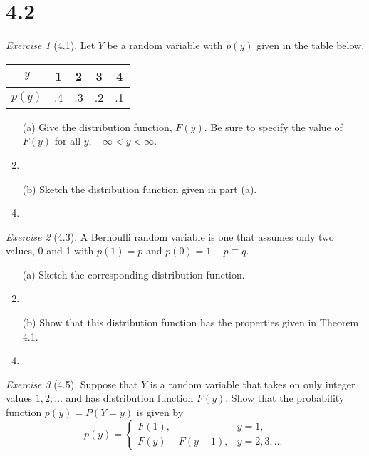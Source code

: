 \documentclass[12pt]{amsart}
\makeatletter
\theoremstyle{remark}
\newtheorem*{exercise}{Exercise}%
\renewenvironment{proof}[1][\proofname]{\par\doublespacing
  \pushQED{\qed}%
  \normalfont \topsep6\p@\@plus6\p@\relax
  \list{}{%
    \settowidth{\leftmargin}{\itshape\proofname:\hskip\labelsep}%
    \setlength{\labelwidth}{0pt}%
    \setlength{\itemindent}{-\leftmargin}%
  }%
  \item[\hskip\labelsep\itshape#1\@addpunct{:}]\ignorespaces
}{%
  \popQED\endlist\@endpefalse
  \singlespacing
}
\theoremstyle{mycomment}
\makeatother
\begin{document}
\section*{4.2}
\begin{exercise}[4.1]
Let $Y$ be a random variable with $p(y)$ given in the table below.
\begin{center}
\begin{tabular}{c|cccc}
$y$ & 1 & 2 & 3 & 4 \\
\hline
$p(y)$ & .4 & .3 & .2 & .1
\end{tabular}
\end{center}

\begin{enumerate}
    \item[(a)] Give the distribution function, $F(y)$. Be sure to specify the value of $F(y)$ for all $y$, $-\infty < y < \infty$.
\begin{proof}[Solution]
 
\end{proof}
    \item[(b)] Sketch the distribution function given in part (a).
\begin{proof}[Solution]
 
\end{proof}
\end{enumerate} 
\end{exercise}

\begin{exercise}[4.3]
A Bernoulli random variable is one that assumes only two values, 0 and 1 with $p(1) = p$ and $p(0) = 1 - p \equiv q$.

\begin{enumerate}
    \item[(a)] Sketch the corresponding distribution function.
\begin{proof}[Solution]
 
\end{proof}
    \item[(b)] Show that this distribution function has the properties given in Theorem 4.1.
\begin{proof}[Solution]
 
\end{proof}
\end{enumerate} 
\end{exercise}

\begin{exercise}[4.5]
Suppose that $Y$ is a random variable that takes on only integer values $1, 2, \ldots$ and has distribution function $F(y)$. Show that the probability function $p(y) = P(Y = y)$ is given by
$$p(y) = \begin{cases}
F(1), & y = 1, \\
F(y) - F(y-1), & y = 2, 3, \ldots
\end{cases}$$

\begin{proof}[Solution]
 
\end{proof}
\end{exercise}
\end{document}
